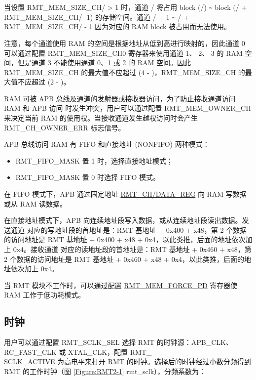 \documentclass[main\_\_CN.tex]{subfiles}
\begin{document}
当设置 RMT\_MEM\_SIZE\_CH/ > 1 时，通道 / 将占用 block (/) \verb+~+ block (/ + RMT\_MEM\_SIZE\_CH/ -1) 的存储空间。通道 / + 1 \verb+~+ / + RMT\_MEM\_SIZE\_CH/ - 1 因为对应的 RAM block 被占用而无法使用。


注意，每个通道使用 RAM 的空间是根据地址从低到高进行映射的，因此通道 0 可以通过配置 RMT\_MEM\_SIZE\_CH0 寄存器来使用通道 1、 2、 3 的 RAM 空间，但是通道 3 不能使用通道 0、1 或 2 的 RAM 空间。因此 RMT\_MEM\_SIZE\_CH 的最大值不应超过 (4 - )，RMT\_MEM\_SIZE\_CH 的最大值不应超过 (2 - )。

RAM 可被 APB 总线及通道的发射器或接收器访问，为了防止接收通道访问 RAM 和 APB 访问 时发生冲突，用户可以通过配置 RMT\_MEM\_OWNER\_CH 来决定当前 RAM 的使用权。当接收通道发生越权访问时会产生 RMT\_CH\_OWNER\_ERR 标志信号。 

APB 总线访问 RAM 有 FIFO 和直接地址 (NONFIFO) 两种模式：
\begin{itemize}
    \item RMT\_FIFO\_MASK 置 1 时，选择直接地址模式；
    \item RMT\_FIFO\_MASK 置 0 时选择 FIFO 模式。
\end{itemize}

在 FIFO 模式下，APB 通过固定地址 \hyperref[regdesc:RMTCHNDATAREG]{RMT\_CH/DATA\_REG} 向 RAM 写数据或从 RAM 读数据。

在直接地址模式下，APB 向连续地址段写入数据，或从连续地址段读出数据。发送通道  对应的写地址段的首地址是：RMT 基地址 + 0x400 + x48，第 2 个数据的访问地址是 RMT 基地址 + 0x400 + x48 + 0x4，以此类推，后面的地址依次加上 0x4。接收通道  对应的读地址段的首地址是：RMT 基地址 + 0x460 + x48，第 2 个数据的访问地址是 RMT 基地址 + 0x460 + x48 + 0x4，以此类推，后面的地址依次加上 0x4。

当 RMT 模块不工作时，可以通过配置 \hyperref[fielddesc:RMTMEMFORCEPD]{RMT\_MEM\_FORCE\_PD} 寄存器使 RAM 工作于低功耗模式。

\subsection{时钟}\label{clock}
用户可以通过配置 RMT\_SCLK\_SEL 选择 RMT 的时钟源：APB\_CLK、RC\_FAST\_CLK 或 XTAL\_CLK，配置 RMT\_\\SCLK\_ACTIVE 为高电平来打开 RMT 的时钟。选择后的时钟经过小数分频得到 RMT 的工作时钟（图 \ref{Figure:RMT2-1} rmt\_sclk），分频系数为：
\end{document}
